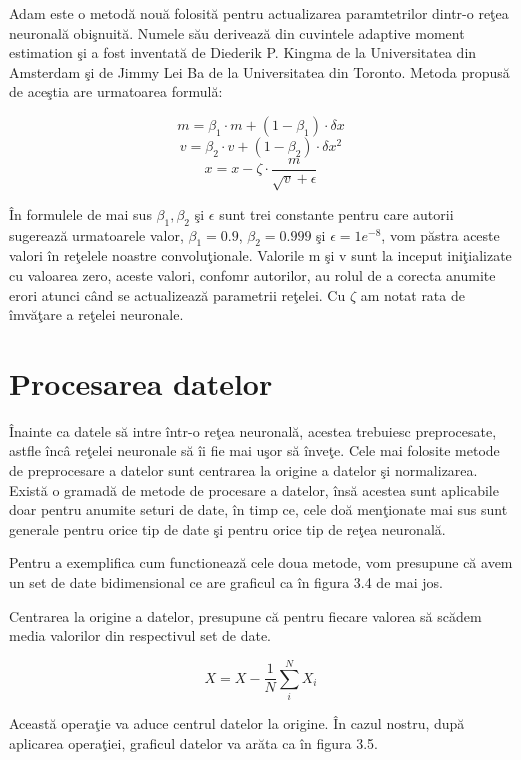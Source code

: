 Adam este o metod\u{a} nou\u{a} folosit\u{a} pentru actualizarea paramtetrilor dintr-o re\c{t}ea neuronal\u{a} obi\c{s}nuit\u{a}. Numele s\u{a}u deriveaz\u{a} din cuvintele adaptive moment estimation \c{s}i a fost inventat\u{a} de Diederik P. Kingma de la Universitatea din Amsterdam \c{s}i de Jimmy Lei Ba de la Universitatea din Toronto. Metoda propus\u{a} de ace\c{s}tia are urmatoarea formul\u{a}:

$$ m = \beta_1 \cdot m + ( 1 - \beta_1 ) \cdot \delta x $$
$$ v = \beta_2 \cdot v + ( 1- \beta_2 ) \cdot \delta x^2 $$
$$ x = x - \zeta \cdot \frac{m}{\sqrt{v} + \epsilon } $$

\^{I}n formulele de mai sus $\beta_1, \beta_2 $ \c{s}i $ \epsilon $ sunt trei constante pentru care autorii sugereaz\u{a} urmatoarele valor, $\beta_1 = 0.9 $, $\beta_2 = 0.999 $ \c{s}i $ \epsilon = 1e^{-8} $, vom p\u{a}stra aceste valori \^{i}n re\c{t}elele noastre convolu\c{t}ionale. Valorile m \c{s}i v sunt la inceput ini\c{t}ializate cu valoarea zero, aceste valori, confomr autorilor, au rolul de a corecta anumite erori atunci c\^{a}nd se actualizeaz\u{a} parametrii re\c{t}elei. Cu $\zeta$ am notat rata de \^{i}mv\u{a}\c{t}are a re\c{t}elei neuronale.

\section{Procesarea datelor}

\^{I}nainte ca datele s\u{a} intre \^{i}ntr-o re\c{t}ea neuronal\u{a}, acestea trebuiesc preprocesate, astfle \^{i}nc\^{a} re\c{t}elei neuronale s\u{a} \^{i}i fie mai u\c{s}or s\u{a} \^{i}nve\c{t}e. Cele mai folosite metode de preprocesare a datelor sunt centrarea la origine a datelor \c{s}i normalizarea. Exist\u{a} o gramad\u{a} de metode de procesare a datelor, \^{i}ns\u{a} acestea sunt aplicabile doar pentru anumite seturi de date, \^{i}n timp ce, cele do\u{a} men\c{t}ionate mai sus sunt generale pentru orice tip de date \c{s}i pentru orice tip de re\c{t}ea neuronal\u{a}.

Pentru a exemplifica cum functioneaz\u{a} cele doua metode, vom presupune c\u{a} avem un set de date bidimensional ce are graficul ca \^{i}n figura 3.4 de mai jos.

Centrarea la origine a datelor, presupune c\u{a} pentru fiecare valorea s\u{a} sc\u{a}dem media valorilor din respectivul set de date.

            $$ X = X - \frac{1}{N}\sum_i^N X_i$$
            
Aceast\u{a} opera\c{t}ie va aduce centrul datelor la origine. \^{I}n cazul nostru, dup\u{a} aplicarea opera\c{t}iei, graficul datelor va ar\u{a}ta ca \^{i}n figura 3.5.

